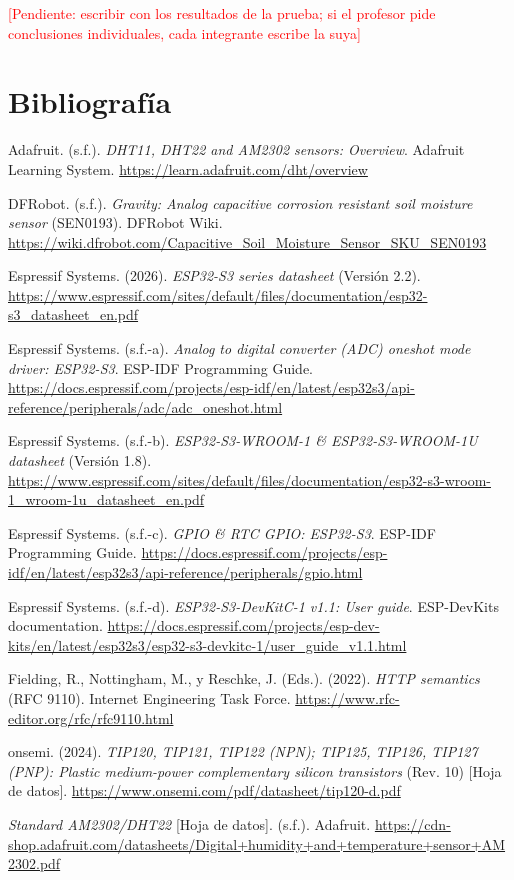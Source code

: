 \documentclass[12pt, letterpaper]{article}
\newcommand{\pendiente}[1]{\textcolor{red}{[Pendiente: #1]}}
\begin{document}
\pendiente{escribir con los resultados de la prueba; si el profesor pide conclusiones individuales, cada integrante
escribe la suya}

\newpage

\section*{Bibliografía}
\begin{list}{}{\setlength{\leftmargin}{1.27cm}\setlength{\itemindent}{-1.27cm}\setlength{\itemsep}{4pt}}
\item Adafruit. (s.f.). \textit{DHT11, DHT22 and AM2302 sensors: Overview}. Adafruit Learning System.
    \url{https://learn.adafruit.com/dht/overview}
\item DFRobot. (s.f.). \textit{Gravity: Analog capacitive corrosion resistant soil moisture sensor} (SEN0193).
    DFRobot Wiki. \url{https://wiki.dfrobot.com/Capacitive_Soil_Moisture_Sensor_SKU_SEN0193}
\item Espressif Systems. (2026). \textit{ESP32-S3 series datasheet} (Versión 2.2).
    \url{https://www.espressif.com/sites/default/files/documentation/esp32-s3_datasheet_en.pdf}
\item Espressif Systems. (s.f.-a). \textit{Analog to digital converter (ADC) oneshot mode driver: ESP32-S3}.
    ESP-IDF Programming Guide.
    \url{https://docs.espressif.com/projects/esp-idf/en/latest/esp32s3/api-reference/peripherals/adc/adc_oneshot.html}
\item Espressif Systems. (s.f.-b). \textit{ESP32-S3-WROOM-1 \& ESP32-S3-WROOM-1U datasheet} (Versión 1.8).
    \url{https://www.espressif.com/sites/default/files/documentation/esp32-s3-wroom-1_wroom-1u_datasheet_en.pdf}
\item Espressif Systems. (s.f.-c). \textit{GPIO \& RTC GPIO: ESP32-S3}. ESP-IDF Programming Guide.
    \url{https://docs.espressif.com/projects/esp-idf/en/latest/esp32s3/api-reference/peripherals/gpio.html}
\item Espressif Systems. (s.f.-d). \textit{ESP32-S3-DevKitC-1 v1.1: User guide}. ESP-DevKits documentation.
    \url{https://docs.espressif.com/projects/esp-dev-kits/en/latest/esp32s3/esp32-s3-devkitc-1/user_guide_v1.1.html}
\item Fielding, R., Nottingham, M., y Reschke, J. (Eds.). (2022). \textit{HTTP semantics} (RFC 9110).
    Internet Engineering Task Force. \url{https://www.rfc-editor.org/rfc/rfc9110.html}
\item onsemi. (2024). \textit{TIP120, TIP121, TIP122 (NPN); TIP125, TIP126, TIP127 (PNP): Plastic medium-power
    complementary silicon transistors} (Rev. 10) [Hoja de datos]. \url{https://www.onsemi.com/pdf/datasheet/tip120-d.pdf}
\item \textit{Standard AM2302/DHT22} [Hoja de datos]. (s.f.). Adafruit.
    \url{https://cdn-shop.adafruit.com/datasheets/Digital+humidity+and+temperature+sensor+AM2302.pdf}
\end{list}
\end{document}
